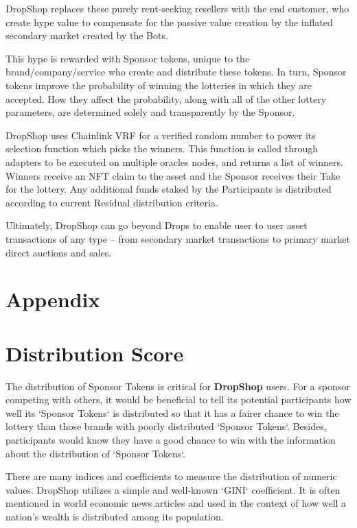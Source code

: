 \documentclass[runningheads]{llncs}
\begin{document}
DropShop replaces these purely rent-seeking resellers with the end customer, who create hype value to compensate for the passive value creation by the inflated secondary market created by the Bots.

This hype is rewarded with Sponsor tokens, unique to the brand/company/service who create and distribute these tokens.  In turn, Sponsor tokens improve the probability of winning the lotteries in which they are accepted.  How they affect the probability, along with all of the other lottery parameters, are determined solely and transparently by the Sponsor.

DropShop uses Chainlink VRF for a verified random number to power its selection function which picks the winners.  This function is called through adapters to be executed on multiple oracles nodes, and returns a list of winners.  Winners receive an NFT claim to the asset and the Sponsor receives their Take for the lottery.  Any additional funds staked by the Participants is distributed according to current Residual distribution criteria.

Ultimately, DropShop can go beyond Drops to enable user to user asset transactions of any type – from secondary market transactions to primary market direct auctions and sales.


\section*{Appendix}
\appendix

\section{Distribution Score}\label{APP-DistributionFunctions}
The distribution of Sponsor Tokens is critical for \textbf{DropShop} users. For a sponsor competing with others, it would be beneficial to tell its potential participants how well its `Sponsor Tokens` is distributed so that it has a fairer chance to win the lottery than those brands with poorly distributed `Sponsor Tokens`. Besides, participants would know they have a good chance to win with the information about the distribution of `Sponsor Tokens`.  

There are many indices and coefficients to measure the distribution of numeric values. DropShop utilizes a simple and well-known `GINI` coefficient. It is often mentioned in world economic news articles and used in the context of how well a nation's wealth is distributed among its population.
\end{document}
